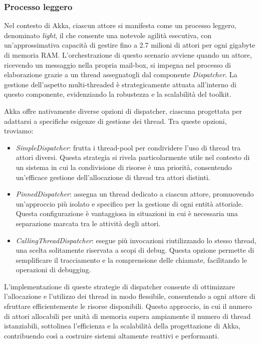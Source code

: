 \subsubsection[Processo leggero]{Processo leggero}
Nel contesto di Akka, ciascun attore si manifesta come un processo leggero, denominato \textit{light}, il che consente una notevole agilità esecutiva, con un'approssimativa capacità di gestire fino a 2.7 milioni di attori per ogni gigabyte di memoria RAM.
L'orchestrazione di questo scenario avviene quando un attore, ricevendo un messaggio nella propria mail-box, si impegna nel processo di elaborazione grazie a un thread assegnatogli dal componente \textit{Dispatcher}.
La gestione dell'aspetto multi-threaded è strategicamente attuata all'interno di questo componente, evidenziando la robustezza e la scalabilità del toolkit.

Akka offre nativamente diverse opzioni di dispatcher, ciascuna progettata per adattarsi a specifiche esigenze di gestione dei thread. Tra queste opzioni, troviamo:
\begin{itemize}
  \item \textit{SimpleDispatcher}: frutta i thread-pool per condividere l'uso di thread tra attori diversi.
  Questa strategia si rivela particolarmente utile nel contesto di un sistema in cui la condivisione di risorse è una priorità, consentendo un'efficace gestione dell'allocazione di thread tra attori distinti.
  \item \textit{PinnedDispatcher}: assegna un thread dedicato a ciascun attore, promuovendo un'approccio più isolato e specifico per la gestione di ogni entità attoriale.
  Questa configurazione è vantaggiosa in situazioni in cui è necessaria una separazione marcata tra le attività degli attori.
  \item \textit{CallingThreadDispatcher}: esegue più invocazioni riutilizzando lo stesso thread, una scelta solitamente riservata a scopi di debug.
  Questa opzione permette di semplificare il tracciamento e la comprensione delle chiamate, facilitando le operazioni di debugging.
\end{itemize}
L'implementazione di queste strategie di dispatcher consente di ottimizzare l'allocazione e l'utilizzo dei thread in modo flessibile, consentendo a ogni attore di sfruttare efficientemente le risorse disponibili.
Questo approccio, in cui il numero di attori allocabili per unità di memoria supera ampiamente il numero di thread istanziabili, sottolinea l'efficienza e la scalabilità della progettazione di Akka, contribuendo così a costruire sistemi altamente reattivi e performanti.

